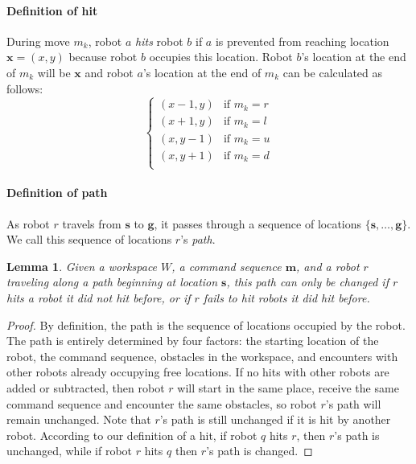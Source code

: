 \documentclass[letterpaper, 10 pt, conference]{ieeeconf}
\newtheorem{lemma}[theorem]{Lemma}
\begin{document}
\paragraph{Definition of hit}
During move $m_k$, robot $a$ \emph{hits} robot $b$ if $a$ is prevented from reaching location $\bm{x}=(x,y)$ because robot $b$ occupies this location. Robot $b$'s location at the end of $m_k$ will be $\bm{x}$ and robot $a$'s location at the end of $m_k$ can be calculated as follows:
\begin{displaymath}
    \left\{
     \begin{array}{ll}
       (x-1,y) &\text{if }m_k=r\\
       (x+1,y) &\text{if }m_k=l\\
       (x,y-1) &\text{if }m_k=u\\
       (x,y+1) &\text{if }m_k=d\\
     \end{array}
   \right.
\end{displaymath} 

\paragraph{Definition of path}
As robot $r$ travels from $\bm{s}$ to $\bm{g}$, it passes through a sequence of locations $\{\bm{s},\ldots,\bm{g}\}$.  We call this sequence of locations $r$'s \emph{path}. 

\begin{lemma}\label{lemma:changeInHitsNeededToChangePath}
Given a workspace $W$, a command sequence $\bm{m}$, and a robot $r$ traveling along a path beginning at location $\bm{s}$, this path can only be changed if $r$ hits a robot it did not hit before, or if $r$ fails to hit robots it did hit before.
\end{lemma}

\begin{proof}
By definition, the path is the sequence of locations occupied by the robot. The path is entirely determined by four factors: the starting location of the robot, the command sequence, obstacles in the workspace,  and encounters with other robots already occupying free locations. If no hits with other robots are added or subtracted, then robot $r$ will start in the same place, receive the same command sequence and encounter the same obstacles, so robot $r$'s path will remain unchanged.  Note that $r$'s path is still unchanged if it is hit by another robot. According to our definition of a hit, if robot $q$ hits $r$, then $r$'s path is unchanged, while if robot $r$ hits $q$ then $r$'s path is changed. 
\end{proof}
\end{document}
